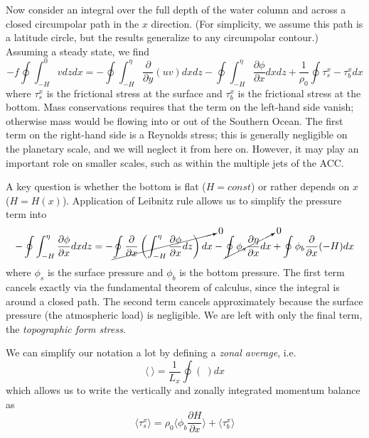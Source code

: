 \documentclass[12pt]{article}
\newcommand{\pd}[2]{ \frac{\partial #1}{\partial #2} }
\newcommand{\ab}[1]{\ensuremath{\langle #1 \rangle}}
\begin{document}
Now consider an integral over the full depth of the water column and across a closed circumpolar path in the $x$ direction. (For simplicity, we assume this path is a latitude circle, but the results generalize to any circumpolar contour.) Assuming a steady state, we find
\begin{equation}
- f \oint \int_{-H}^0 v dz dx = -\oint \int_{-H}^\eta \pd{}{y}(uv) dx dz - \oint \int_{-H}^\eta \pd{\phi}{x} dx dz + \frac{1}{\rho_0}\oint \tau^x_s - \tau^x_b dx
\end{equation}
where $\tau^x_s$ is the frictional stress at the surface and $\tau^x_b$ is the frictional stress at the bottom.
Mass conservations requires that the term on the left-hand side vanish; otherwise mass would be flowing into or out of the Southern Ocean. The first term on the right-hand side is a Reynolds stress; this is generally negligible on the planetary scale, and we will neglect it from here on. However, it may play an important role on smaller scales, such as within the multiple jets of the ACC.

A key question is whether the bottom is flat ($H = const$) or rather depends on $x$ ($H = H(x)$). Application of Leibnitz rule allows us to simplify the pressure term into
\begin{equation}
-\oint \int_{-H}^\eta \pd{\phi}{x} dx dz = -\cancelto{0}{\oint \pd{}{x} \left ( \int_{-H}^\eta \pd{\phi}{x} dz \right ) dx} - \cancelto{0}{\oint \phi_s \pd{\eta}{x} dx} + \oint \phi_b \pd{}{x}(-H)dx 
\end{equation}
where $\phi_s$ is the surface pressure and $\phi_b$ is the bottom pressure. The first term cancels exactly via the fundamental theorem of calculus, since the integral is around a closed path. The second term cancels approximately because the surface pressure (the atmospheric load) is negligible. We are left with only the final term, the {\em topographic form stress}.

We can simplify our notation a lot by defining a {\em zonal average}, i.e.
\begin{equation}
\ab{ \ } = \frac{1}{L_x} \oint ( \ ) dx
\end{equation}
which allows us to write the vertically and zonally integrated momentum balance as
\begin{equation}
\ab{\tau^x_s} =  \rho_0 \ab{\phi_b \pd{H}{x}} + \ab{\tau^x_b}
\label{eq:mom}
\end{equation}
\end{document}
